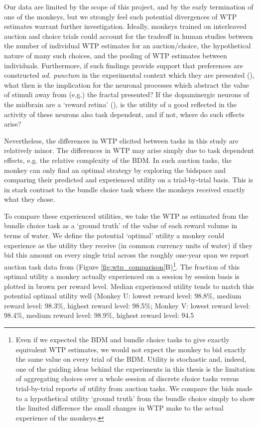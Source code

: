 Our data are limited by the scope of this project, and by the early termination of one of the monkeys, but we strongly feel such potential divergences of WTP estimates warrant further investigation. Ideally, monkeys trained on interleaved auction and choice trials could account for the tradeoff in human studies between the number of individual WTP estimates for an auction/choice, the hypothetical nature of many such choices, and the pooling of WTP estimates between individuals. Furthermore, if such findings provide support that preferences are constructed \textit{ad. punctum} in the experimental context which they are presented (\cite{slovicConstructionPreference1995}), what then is the implication for the neuronal processes which abstract the value of stimuli away from (e.g.) the fractal presented? If the dopaminergic neurons of the midbrain are a ‘reward retina’ (\cite{schultz2009midbrain}), is the utility of a good reflected in the activity of these neurons also task dependent, and if not, where do such effects arise?

Nevertheless, the differences in WTP elicited between tasks in this study are relatively minor. The differences in WTP may arise simply due to task dependent effects, e.g. the relative complexity of the BDM. In such auction tasks, the monkey can only find an optimal strategy by exploring the bidspace and comparing their predicted and experienced utility on a trial-by-trial basis. This is in stark contrast to the bundle choice task where the monkeys received exactly what they chose.

To compare these experienced utilities, we take the WTP as estimated from the bundle choice task as a ‘ground truth’ of the value of each reward volume in terms of water. We define the potential ‘optimal’ utility a monkey could experience as the utility they receive (in common currency units of water) if they bid this amount on every single trial across the roughly one-year span we report auction task data from (Figure \ref{fig:wtp_comparison}B)\footnote{  Even if we expected the BDM and bundle choice tasks to give exactly equivalent WTP estimates, we would not expect the monkey to bid exactly the same value on every trial of the BDM. Utility is stochastic and, indeed, one of the guiding ideas behind the experiments in this thesis is the limitation of aggregating choices over a whole session of discrete choice tasks versus trial-by-trial reports of utility from auction tasks. We compare the bids made to a hypothetical utility ‘ground truth’ from the bundle choice simply to show the limited difference the small changes in WTP make to the actual experience of the monkeys.}. The fraction of this optimal utility a monkey actually experienced on a session by session basis is plotted in brown per reward level. Median experienced utility tends to match this potential optimal utility well (Monkey U: lowest reward level: 98.8\%, medium reward level: 98.3\%, highest reward level: 98.5\%; Monkey V: lowest reward level: 98.4\%, medium reward level: 98.9\%, highest reward level: 94.5%

